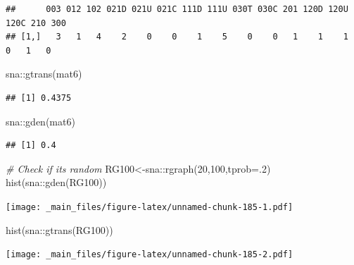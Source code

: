 \documentclass[
  notitlepage,
  onecolumn,
  openany]{book}
\newenvironment{Shaded}{\begin{snugshade}}{\end{snugshade}}
\newcommand{\AttributeTok}[1]{\textcolor[rgb]{0.77,0.63,0.00}{#1}}
\newcommand{\CommentTok}[1]{\textcolor[rgb]{0.56,0.35,0.01}{\textit{#1}}}
\newcommand{\DecValTok}[1]{\textcolor[rgb]{0.00,0.00,0.81}{#1}}
\newcommand{\FunctionTok}[1]{\textcolor[rgb]{0.00,0.00,0.00}{#1}}
\newcommand{\NormalTok}[1]{#1}
\newcommand{\OtherTok}[1]{\textcolor[rgb]{0.56,0.35,0.01}{#1}}
\newcommand{\SpecialCharTok}[1]{\textcolor[rgb]{0.00,0.00,0.00}{#1}}
\begin{document}
\begin{verbatim}
##      003 012 102 021D 021U 021C 111D 111U 030T 030C 201 120D 120U 120C 210 300
## [1,]   3   1   4    2    0    0    1    5    0    0   1    1    1    0   1   0
\end{verbatim}

\begin{Shaded}
\begin{Highlighting}[]
\NormalTok{sna}\SpecialCharTok{::}\FunctionTok{gtrans}\NormalTok{(mat6)}
\end{Highlighting}
\end{Shaded}

\begin{verbatim}
## [1] 0.4375
\end{verbatim}

\begin{Shaded}
\begin{Highlighting}[]
\NormalTok{sna}\SpecialCharTok{::}\FunctionTok{gden}\NormalTok{(mat6)}
\end{Highlighting}
\end{Shaded}

\begin{verbatim}
## [1] 0.4
\end{verbatim}

\begin{Shaded}
\begin{Highlighting}[]
\CommentTok{\# Check if it\textquotesingle{}s random}
\NormalTok{RG100}\OtherTok{\textless{}{-}}\NormalTok{sna}\SpecialCharTok{::}\FunctionTok{rgraph}\NormalTok{(}\DecValTok{20}\NormalTok{,}\DecValTok{100}\NormalTok{,}\AttributeTok{tprob=}\NormalTok{.}\DecValTok{2}\NormalTok{)}
\FunctionTok{hist}\NormalTok{(sna}\SpecialCharTok{::}\FunctionTok{gden}\NormalTok{(RG100))}
\end{Highlighting}
\end{Shaded}

\texttt{[image: \_main\_files/figure-latex/unnamed-chunk-185-1.pdf]}

\begin{Shaded}
\begin{Highlighting}[]
\FunctionTok{hist}\NormalTok{(sna}\SpecialCharTok{::}\FunctionTok{gtrans}\NormalTok{(RG100))}
\end{Highlighting}
\end{Shaded}

\texttt{[image: \_main\_files/figure-latex/unnamed-chunk-185-2.pdf]}
\end{document}
